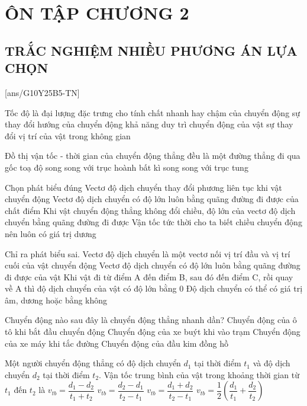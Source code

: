 \section{ÔN TẬP CHƯƠNG 2}
\subsection{TRẮC NGHIỆM NHIỀU PHƯƠNG ÁN LỰA CHỌN}
\setcounter{ex}{0}
[ans/G10Y25B5-TN]
\begin{ex}
	Tốc độ là đại lượng đặc trưng cho
	\choice
	{\True tính chất nhanh hay chậm của chuyển động}
	{sự thay đổi hướng của chuyển động}
	{khả năng duy trì chuyển động của vật}
	{sự thay đổi vị trí của vật trong không gian}
	\loigiai{}
\end{ex}

\begin{ex}
	Đồ thị vận tốc - thời gian của chuyển động thẳng đều là một đường thẳng
	\choice
	{đi qua gốc toạ độ}
	{\True song song với trục hoành}
	{bất kì}
	{song song với trục tung}
	\loigiai{}
\end{ex}

\begin{ex}
	Chọn phát biểu đúng
	\choice
	{Vectơ độ dịch chuyển thay đổi phương liên tục khi vật chuyển động}
	{Vectơ độ dịch chuyển có độ lớn luôn bằng quãng đường đi được của chất điểm}
	{\True Khi vật chuyển động thẳng không đổi chiều, độ lớn của vectơ độ dịch chuyển bằng quãng đường đi được}
	{Vận tốc tức thời cho ta biết chiều chuyển động nên luôn có giá trị dương}
	\loigiai{}
\end{ex}

\begin{ex}
	Chỉ ra phát biểu sai.
	\choice
	{Vectơ độ dịch chuyển là một vectơ nối vị trí đầu và vị trí cuối của vật chuyển động}
	{\True Vectơ độ dịch chuyển có độ lớn luôn bằng quãng đường đi được của vật}
	{Khi vật đi từ điểm A đến điểm B, sau đó đến điểm C, rồi quay về A thì độ dịch chuyển của vật có độ lớn bằng 0}
	{Độ dịch chuyển có thể có giá trị âm, dương hoặc bằng không}
	\loigiai{}
\end{ex}

\begin{ex}
	Chuyển động nào sau đây là chuyển động thẳng nhanh dần?
	\choice
	{\True Chuyển động của ô tô khi bắt đầu chuyển động}
	{Chuyển động của xe buýt khi vào trạm}
	{Chuyển động của xe máy khi tắc đường}
	{Chuyển động của đầu kim đồng hồ}
	\loigiai{}
\end{ex}

\begin{ex}
	Một người chuyển động thẳng có độ dịch chuyển $d_1$ tại thời điểm $t_1$ và độ dịch chuyển $d_2$ tại thời điểm $t_2$. Vận tốc trung bình của vật trong khoảng thời gian từ $t_1$ đến $t_2$ là
	\choice
	{$v_{tb}=\dfrac{d_1-d_2}{t_1+t_2}$}
	{\True $v_{tb}=\dfrac{d_2-d_1}{t_2-t_1}$}
	{$v_{tb}=\dfrac{d_1+d_2}{t_2-t_1}$}
	{$v_{tb}=\dfrac{1}{2}\left(\dfrac{d_1}{t_1}+\dfrac{d_2}{t_2}\right)$}
	\loigiai{}
\end{ex}

